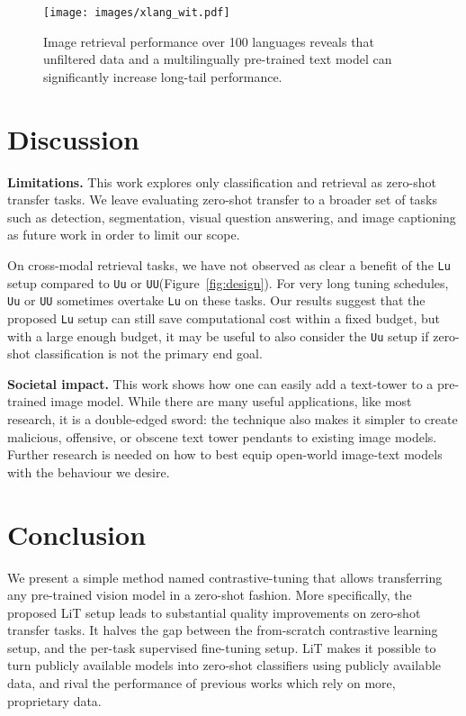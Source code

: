 \documentclass[10pt,twocolumn,letterpaper]{article}
\def \lit {LiT\xspace}
\def \Lu {{\tt Lu}\xspace}
\def \Uu {{\tt Uu}\xspace}
\def \UU {{\tt UU}\xspace}
\begin{document}
\begin{figure}[t]
    \centering
    \texttt{[image: images/xlang\_wit.pdf]}
    \caption{Image retrieval performance over 100 languages reveals that unfiltered data and a multilingually pre-trained text model can significantly increase long-tail performance.}\label{fig:xlang_wit}
\end{figure}




\section{Discussion}\label{sec:discussion}

\textbf{Limitations.} This work explores only classification and retrieval as zero-shot transfer tasks.
We leave evaluating zero-shot transfer to a broader set of tasks such as detection, segmentation, visual question answering, and image captioning as future work in order to limit our scope.

On cross-modal retrieval tasks, we have not observed as clear a benefit of the \Lu setup compared to \Uu or \UU (Figure~\ref{fig:design}). 
For very long tuning schedules, \Uu or \UU sometimes overtake \Lu on these tasks.
Our results suggest that the proposed \Lu setup can still save computational cost within a fixed budget, but with a large enough budget, it may be useful to also consider the \Uu setup if zero-shot classification is not the primary end goal.

\textbf{Societal impact.} This work shows how one can easily add a text-tower to a pre-trained image model. While there are many useful applications, like most research, it is a double-edged sword: the technique also makes it simpler to create malicious, offensive, or obscene text tower pendants to existing image models.
Further research is needed on how to best equip open-world image-text models with the behaviour we desire. 




\section{Conclusion}\label{sec:conclusion}

We present a simple method named contrastive-tuning that allows transferring any pre-trained vision model in a zero-shot fashion.
More specifically, the proposed \lit{} setup leads to substantial quality improvements on zero-shot transfer tasks.
It halves the gap between the from-scratch contrastive learning setup, and the per-task supervised fine-tuning setup.
\lit makes it possible to turn publicly available models into zero-shot classifiers using publicly available data, and rival the performance of previous works which rely on more, proprietary data.
\end{document}
